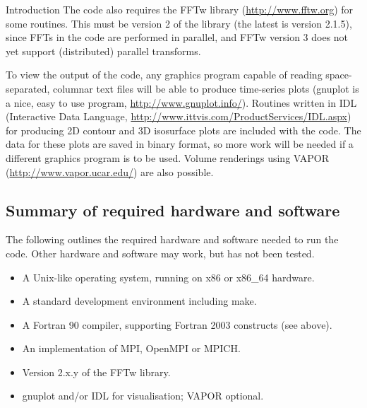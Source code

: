 \begin{chapter}{\label{cha:introduction}Introduction}
  The code also requires the FFTw library (\url{http://www.fftw.org}) for some
  routines.  This must be version 2 of the library (the latest is version
  2.1.5), since FFTs in the code are performed in parallel, and FFTw version 3
  does not yet support (distributed) parallel transforms.

  To view the output of the code, any graphics program capable of reading
  space-separated, columnar text files will be able to produce time-series
  plots (gnuplot is a nice, easy to use program,
  \url{http://www.gnuplot.info/}).  Routines written in IDL (Interactive Data
  Language, \url{http://www.ittvis.com/ProductServices/IDL.aspx}) for producing
  2D contour and 3D isosurface plots are included with the code.  The data for
  these plots are saved in binary format, so more work will be needed if a
  different graphics program is to be used.  Volume renderings using VAPOR
  (\url{http://www.vapor.ucar.edu/}) are also possible.

  \subsection{Summary of required hardware and software}
  The following outlines the required hardware and software needed to run the
  code.  Other hardware and software may work, but has not been tested.
  \begin{itemize}
    \item A Unix-like operating system, running on x86 or x86\_64 hardware.
    \item A standard development environment including make.
    \item A Fortran 90 compiler, supporting Fortran 2003 constructs (see
      above).
    \item An implementation of MPI, \eg OpenMPI or MPICH.
    \item Version 2.x.y of the FFTw library.
    \item gnuplot and/or IDL for visualisation; VAPOR optional.
  \end{itemize}


\end{chapter}
